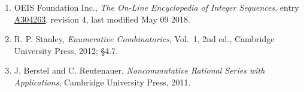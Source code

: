 \documentclass[11pt]{article}
\theoremstyle{definition}
\begin{document}
\begin{enumerate}

\item OEIS Foundation Inc., \emph{The On-Line Encyclopedia of Integer Sequences}, entry \href{https://oeis.org/A304263}{A304263}, revision 4, last modified May 09 2018.

\item R. P. Stanley, \emph{Enumerative Combinatorics}, Vol.~1, 2nd ed., Cambridge University Press, 2012; \S4.7.

\item J. Berstel and C. Reutenauer, \emph{Noncommutative Rational Series with Applications}, Cambridge University Press, 2011.

\end{enumerate}
\end{document}
